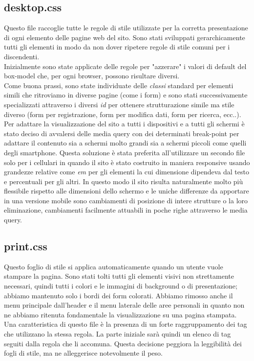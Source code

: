 	\subsection{desktop.css}
	Questo file raccoglie tutte le regole di stile utilizzate per la corretta presentazione di ogni elemento delle pagine web del sito. Sono stati sviluppati gerarchicamente tutti gli elementi in modo da non dover ripetere regole di stile comuni per i discendenti. \\
	Inizialmente sono state applicate delle regole per "azzerare" i valori di default del box-model che, per ogni browser, possono risultare diversi.\\
	Come buona prassi, sono state individuate delle \emph{classi} standard per elementi simili che ritroviamo in diverse pagine (come i form) e sono stati successivamente specializzati attraverso i diversi \emph{id} per ottenere strutturazione simile ma stile diverso (form per registrazione, form per modifica dati, form per ricerca, ecc..).\\
	Per adattare la visualizzazione del sito a tutti i dispositivi e a tutti gli schermi è stato deciso di avvalersi delle media query con dei determinati break-point per adattare il contenuto sia a schermi molto grandi sia a schermi piccoli come quelli degli smartphone. Questa soluzione è stata preferita all'utilizzare un secondo file solo per i cellulari in quando il sito è stato costruito in maniera responsive usando grandezze relative come \emph{em} per gli elementi la cui dimensione dipendeva dal testo e percentuali per gli altri. In questo modo il sito risulta naturalmente molto più flessibile rispetto alle dimensioni dello schermo e le uniche differenze da apportare in una versione mobile sono cambiamenti di posizione di intere strutture o la loro eliminazione, cambiamenti facilmente attuabili in poche righe attraverso le media query.
	
	\subsection{print.css}
	Questo foglio di stile si applica automaticamente quando un utente vuole
stampare la pagina. Sono stati tolti tutti gli elementi visivi non strettamente necessari, quindi tutti i colori e le immagini di background o di presentazione; abbiamo mantenuto solo i bordi dei form colorati. Abbiamo rimosso anche il menu principale dall'header e il menu laterale delle aree personali in quanto non ne abbiamo ritenuta fondamentale la visualizzazione su una pagina stampata. Una caratteristica di questo file è la presenza di un forte raggruppamento dei tag che utilizzano la stessa regola. La parte iniziale sarà quindi un elenco di tag seguiti dalla regola che li accomuna. Questa decisione peggiora la leggibilità dei fogli di stile, ma ne alleggerisce notevolmente il peso.




